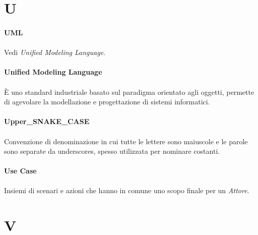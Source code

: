 \documentclass[10pt, a4paper]{article}
\begin{document}
\newpage
\section{U}

\vspace{2em}
\paragraph{UML}\noindent\hrulefill 
\paragraph{}Vedi \textit{Unified Modeling Language\pg}.

\vspace{2em}
\paragraph{Unified Modeling Language}\noindent\hrulefill
\paragraph{}È uno standard industriale basato sul paradigma orientato agli oggetti, permette di agevolare la modellazione e progettazione di sistemi informatici.

\vspace{2em}
\paragraph{Upper\_SNAKE\_CASE}\noindent\hrulefill
\paragraph{}Convenzione di denominazione in cui tutte le lettere sono maiuscole e le parole sono separate da underscores, spesso utilizzata per nominare costanti.


\vspace{2em}
\paragraph{Use Case}\noindent\hrulefill
\paragraph{}Insiemi di scenari e azioni che hanno in comune uno scopo finale per un \textit{Attore\pg}.

\newpage
\section{V}
\vspace{2em}
\end{document}
